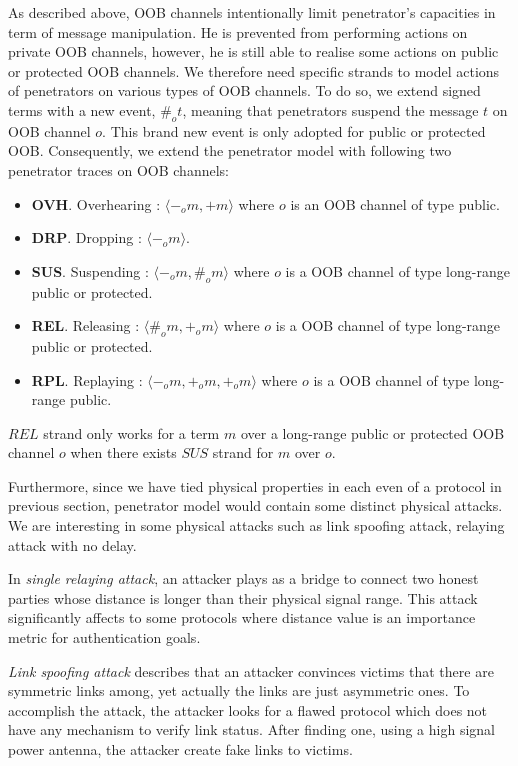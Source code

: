 As described above, OOB channels intentionally limit penetrator's capacities in term of message manipulation. He is prevented from performing actions on private OOB channels, however, he is still able to realise some actions on public or protected OOB channels. We therefore need specific strands to model actions of penetrators on various types of OOB channels. To do so, we extend signed terms with a new event, $\#_ot$, meaning that penetrators suspend the message $t$ on OOB channel $o$. This brand new event is only adopted for public or protected OOB. Consequently, we extend the penetrator model with following two penetrator traces on OOB channels:

\begin{itemize}
\item \textbf{OVH}. Overhearing : $\langle -_om, +m \rangle$ where $o$ is an OOB channel of type public.
\item \textbf{DRP}. Dropping : $\langle -_om \rangle$.
\item \textbf{SUS}. Suspending : $\langle -_om,\#_om \rangle$ where $o$ is a OOB channel of type long-range public or protected. 
\item \textbf{REL}. Releasing : $\langle \#_om,+_om  \rangle$ where $o$ is a OOB channel of type long-range public or protected.
\item \textbf{RPL}. Replaying : $\langle -_om,+_om,+_om  \rangle$ where $o$ is a OOB channel of type long-range public.
\end{itemize} 

$REL$ strand only works for a term $m$ over a long-range public or protected OOB channel $o$ when there exists $SUS$ strand for $m$ over $o$.

Furthermore, since we have tied physical properties in each even of a protocol in previous section, penetrator model would contain some distinct physical attacks. We are interesting in some physical attacks such as link spoofing attack, relaying attack with no delay. 

In \emph{single relaying attack}, an attacker plays as a bridge to connect two honest parties whose distance is longer than their physical signal range. This attack significantly affects to some protocols where distance value is an importance metric for authentication goals. 

\emph{Link spoofing attack} describes that an attacker convinces victims that there are symmetric links among, yet actually the links are just asymmetric ones. To accomplish the attack, the attacker looks for a flawed protocol which does not have any mechanism to verify link status. After finding one, using a high signal power antenna, the attacker create fake links to victims. 

